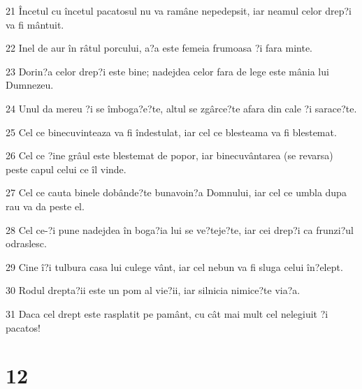 \par 21 Încetul cu încetul pacatosul nu va ramâne nepedepsit, iar neamul celor drep?i va fi mântuit.
\par 22 Inel de aur în râtul porcului, a?a este femeia frumoasa ?i fara minte.
\par 23 Dorin?a celor drep?i este bine; nadejdea celor fara de lege este mânia lui Dumnezeu.
\par 24 Unul da mereu ?i se îmboga?e?te, altul se zgârce?te afara din cale ?i sarace?te.
\par 25 Cel ce binecuvinteaza va fi îndestulat, iar cel ce blesteama va fi blestemat.
\par 26 Cel ce ?ine grâul este blestemat de popor, iar binecuvântarea (se revarsa) peste capul celui ce îl vinde.
\par 27 Cel ce cauta binele dobânde?te bunavoin?a Domnului, iar cel ce umbla dupa rau va da peste el.
\par 28 Cel ce-?i pune nadejdea în boga?ia lui se ve?teje?te, iar cei drep?i ca frunzi?ul odraslesc.
\par 29 Cine î?i tulbura casa lui culege vânt, iar cel nebun va fi sluga celui în?elept.
\par 30 Rodul drepta?ii este un pom al vie?ii, iar silnicia nimice?te via?a.
\par 31 Daca cel drept este rasplatit pe pamânt, cu cât mai mult cel nelegiuit ?i pacatos!

\chapter{12}

